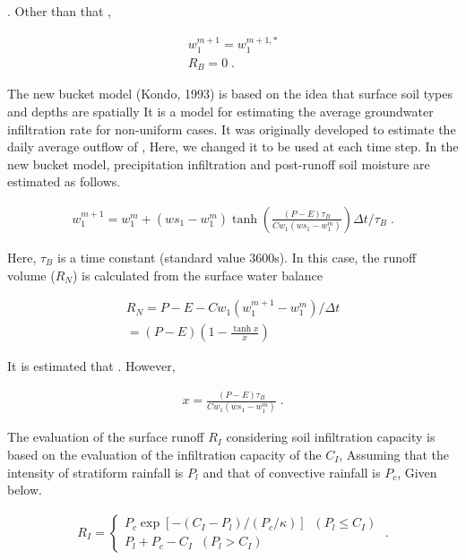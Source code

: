 . Other than that ,

\begin{eqnarray}
  w_1^{m+1}  =   w_1^{m+1,*} \\
  R_B        =   0                  \; .
\end{eqnarray}

The new bucket model (Kondo, 1993) is based on the idea that surface
soil types and depths are spatially It is a model for estimating the
average groundwater infiltration rate for non-uniform cases. It was
originally developed to estimate the daily average outflow of , Here, we
changed it to be used at each time step. In the new bucket model,
precipitation infiltration and post-runoff soil moisture are estimated
as follows.

\begin{eqnarray}
w_1^{m+1} = w_1^m + ( ws_1 - w_1^m ) 
\tanh\left( \frac{(P-E)\tau_B}{Cw_1(ws_1 - w_1^m)} \right) 
\Delta t / \tau_B \; .
\end{eqnarray}

Here, \(\tau_B\) is a time constant (standard value 3600s). In this
case, the runoff volume (\(R_N\)) is calculated from the surface water
balance

\begin{eqnarray}
     R_N  =  P - E - Cw_1 ( w_1^{m+1} - w_1^m ) / \Delta t \\
          =  (P - E) \left( 1 - \frac{\tanh x}{x} \right)
\end{eqnarray}

It is estimated that . However,

\begin{eqnarray}
  x = \frac{(P-E)\tau_B}{Cw_1(ws_1 - w_1^m)} \; .
\end{eqnarray}

The evaluation of the surface runoff \(R_I\) considering soil
infiltration capacity is based on the evaluation of the infiltration
capacity of the \(C_I\), Assuming that the intensity of stratiform
rainfall is \(P_l\) and that of convective rainfall is \(P_c\), Given
below.

\begin{eqnarray}
  R_I = \left\{
    \begin{array}{ll}
       P_c \exp [ -(C_I-P_l) / (P_c/\kappa) ]  \;\; ( P_l \le C_I ) \\
       P_l + P_c - C_I                         \;\; ( P_l > C_I ) 
    \end{array}
  \right. \; .
\end{eqnarray}

